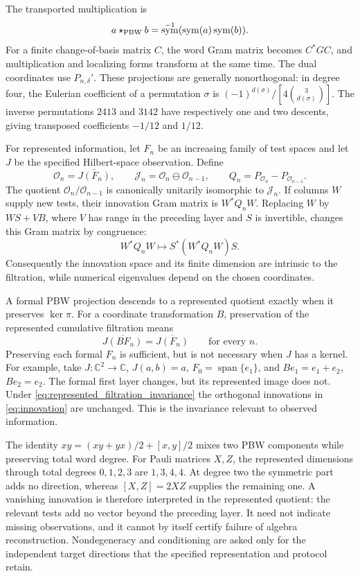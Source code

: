 \documentclass[11pt,a4paper]{amsart}
\numberwithin{equation}{section}
\theoremstyle{definition}
\theoremstyle{remark}
\newcommand{\C}{\mathbb C}
\DeclareMathOperator{\Span}{span}
\DeclareMathOperator{\sym}{sym}
\begin{document}
The transported multiplication is
\begin{equation}\label{eq:pbwtransport}
 a\star_{\rm PBW}b=\sym^{-1}(\sym(a)\sym(b)).
\end{equation}
For a finite change-of-basis matrix $C$, the word Gram matrix becomes $C^*GC$, and multiplication and localizing forms transform at the same time. The dual coordinates use $P_{n,\delta}'$. These projections are generally nonorthogonal: in degree four, the Eulerian coefficient of a permutation $\sigma$ is
$(-1)^{d(\sigma)}/[4\binom3{d(\sigma)}]$.
The inverse permutations $2413$ and $3142$ have respectively one and two descents, giving transposed coefficients $-1/12$ and $1/12$.

For represented information, let $F_n$ be an increasing family of test spaces and let $J$ be the specified Hilbert-space observation. Define
\begin{equation}\label{eq:innovation}
 \mathcal O_n=\overline{J(F_n)},\qquad
 \mathcal J_n=\mathcal O_n\ominus\mathcal O_{n-1},\qquad
 Q_n=P_{\mathcal O_n}-P_{\mathcal O_{n-1}}.
\end{equation}
The quotient $\mathcal O_n/\mathcal O_{n-1}$ is canonically unitarily isomorphic to $\mathcal J_n$. If columns $W$ supply new tests, their innovation Gram matrix is $W^*Q_nW$. Replacing $W$ by $WS+VB$, where $V$ has range in the preceding layer and $S$ is invertible, changes this Gram matrix by congruence:
\[
 W^*Q_nW\longmapsto S^*(W^*Q_nW)S.
\]
Consequently the innovation space and its finite dimension are intrinsic to the filtration, while numerical eigenvalues depend on the chosen coordinates.

A formal PBW projection descends to a represented quotient exactly when it preserves $\ker\pi$. For a coordinate transformation $B$, preservation of the represented cumulative filtration means
\begin{equation}\label{eq:represented_filtration_invariance}
 \overline{J(BF_n)}=\overline{J(F_n)}\qquad\text{for every }n.
\end{equation}
Preserving each formal $F_n$ is sufficient, but is not necessary when $J$ has a kernel. For example, take $J:\C^2\to\C$, $J(a,b)=a$, $F_0=\Span\{e_1\}$, and $Be_1=e_1+e_2$, $Be_2=e_2$. The formal first layer changes, but its represented image does not. Under \eqref{eq:represented_filtration_invariance} the orthogonal innovations in \eqref{eq:innovation} are unchanged. This is the invariance relevant to observed information.

The identity $xy=(xy+yx)/2+[x,y]/2$ mixes two PBW components while preserving total word degree. For Pauli matrices $X,Z$, the represented dimensions through total degrees $0,1,2,3$ are $1,3,4,4$. At degree two the symmetric part adds no direction, whereas $[X,Z]=2XZ$ supplies the remaining one.
A vanishing innovation is therefore interpreted in the represented quotient: the relevant tests add no vector beyond the preceding layer. It need not indicate missing observations, and it cannot by itself certify failure of algebra reconstruction. Nondegeneracy and conditioning are asked only for the independent target directions that the specified representation and protocol retain.
\end{document}
